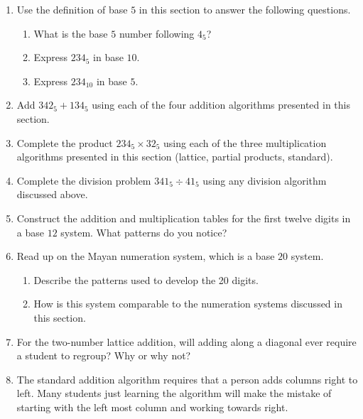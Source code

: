 \documentclass[
]{book}
\providecommand{\tightlist}{%
  \setlength{\itemsep}{0pt}\setlength{\parskip}{0pt}}
\theoremstyle{definition}
\theoremstyle{definition}
\theoremstyle{definition}
\theoremstyle{definition}
\theoremstyle{remark}
\begin{document}
\begin{enumerate}
\def\labelenumi{\arabic{enumi}.}
\item
  Use the definition of base \(5\) in this section to answer the following questions.

  \begin{enumerate}
  \def\labelenumii{\alph{enumii}.}
  \tightlist
  \item
    What is the base \(5\) number following \(4_{5}\)?
  \item
    Express \(234_{5}\) in base \(10\).
  \item
    Express \(234_{10}\) in base \(5\).
  \end{enumerate}
\item
  Add \(342_5+134_5\) using each of the four addition algorithms presented in this section.
\item
  Complete the product \(234_5 \times 32_5\) using each of the three multiplication algorithms presented in this section (lattice, partial products, standard).
\item
  Complete the division problem \(341_5 \div 41_5\) using any division algorithm discussed above.
\item
  Construct the addition and multiplication tables for the first twelve digits in a base \(12\) system. What patterns do you notice?
\item
  Read up on the Mayan numeration system, which is a base \(20\) system.

  \begin{enumerate}
  \def\labelenumii{\alph{enumii}.}
  \tightlist
  \item
    Describe the patterns used to develop the 20 digits.
  \item
    How is this system comparable to the numeration systems discussed in this section.
  \end{enumerate}
\item
  For the two-number lattice addition, will adding along a diagonal ever require a student to regroup? Why or why not?
\item
  The standard addition algorithm requires that a person adds columns right to left. Many students just learning the algorithm will make the mistake of starting with the left most column and working towards right.


\end{enumerate}
\end{document}
